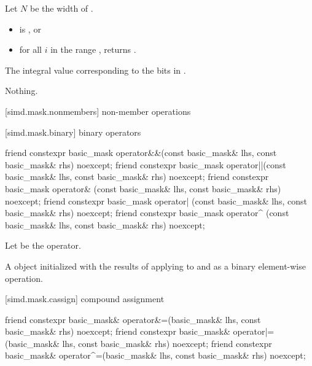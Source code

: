 \begin{itemdescr}
\pnum
Let $N$ be the width of .

\pnum
\expects
\begin{itemize}
\item {} is , or
\item for all $i$ in the range ,  returns .
\end{itemize}

\pnum
\returns
The integral value corresponding to the bits in .

\pnum
\throws
Nothing.
\end{itemdescr}

[simd.mask.nonmembers]{ non-member operations}

[simd.mask.binary]{ binary operators}

\begin{itemdecl}
friend constexpr basic_mask
  operator&&(const basic_mask& lhs, const basic_mask& rhs) noexcept;
friend constexpr basic_mask
  operator||(const basic_mask& lhs, const basic_mask& rhs) noexcept;
friend constexpr basic_mask
  operator& (const basic_mask& lhs, const basic_mask& rhs) noexcept;
friend constexpr basic_mask
  operator| (const basic_mask& lhs, const basic_mask& rhs) noexcept;
friend constexpr basic_mask
  operator^ (const basic_mask& lhs, const basic_mask& rhs) noexcept;
\end{itemdecl}

\begin{itemdescr}
\pnum
Let  be the operator.

\pnum
\returns
A  object initialized with the results of applying
 to  and  as a binary element-wise
operation.
\end{itemdescr}

[simd.mask.cassign]{ compound assignment}

\begin{itemdecl}
friend constexpr basic_mask&
  operator&=(basic_mask& lhs, const basic_mask& rhs) noexcept;
friend constexpr basic_mask&
  operator|=(basic_mask& lhs, const basic_mask& rhs) noexcept;
friend constexpr basic_mask&
  operator^=(basic_mask& lhs, const basic_mask& rhs) noexcept;
\end{itemdecl}

